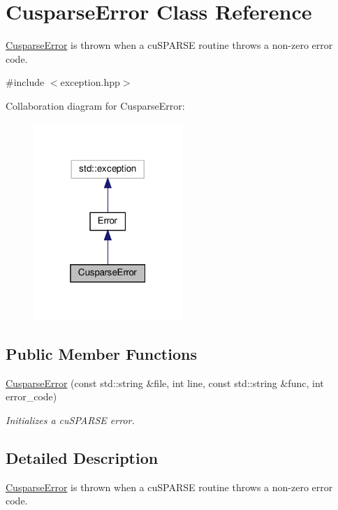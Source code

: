 \hypertarget{classCusparseError}{}\section{Cusparse\+Error Class Reference}
\label{classCusparseError}


\hyperlink{classCusparseError}{Cusparse\+Error} is thrown when a cu\+S\+P\+A\+R\+SE routine throws a non-\/zero error code.  




{\ttfamily \#include $<$exception.\+hpp$>$}



Collaboration diagram for Cusparse\+Error\+:
\nopagebreak
\begin{figure}[H]
\begin{center}
\leavevmode
\includegraphics[width=160pt]{classCusparseError__coll__graph}
\end{center}
\end{figure}
\subsection*{Public Member Functions}
\begin{DoxyCompactItemize}
\item 
\hyperlink{classCusparseError_a56df91abf5b97f10bdc6540e06d21617}{Cusparse\+Error} (const std\+::string \&file, int line, const std\+::string \&func, int error\+\_\+code)
\begin{DoxyCompactList}\small\item\em Initializes a cu\+S\+P\+A\+R\+SE error. \end{DoxyCompactList}\end{DoxyCompactItemize}


\subsection{Detailed Description}
\hyperlink{classCusparseError}{Cusparse\+Error} is thrown when a cu\+S\+P\+A\+R\+SE routine throws a non-\/zero error code. 

